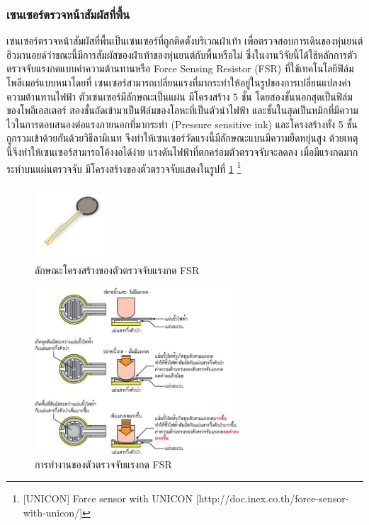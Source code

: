 \subsubsection{เซนเซอร์ตรวจหน้าสัมผัสที่พื้น}
เซนเซอร์ตรวจหน้าสัมผัสที่พื้นเป็นเซนเซอร์ที่ถูกติดตั้งบริเวณฝ่าเท้า เพื่อตรวจสอบการเดินของหุ่นยนต์ฮิวมานอยด์ว่าขณะนี้มีการสัมผัสของฝ่าเท้าของหุ่นยนต์กับพื้นหรือไม่
ซึ่งในงานวิจัยนี้ได้ใช้หลักการตัวตรวจจับแรงกดแบบค่าความต้านทานหรือ Force Sensing Resistor (FSR) ที่ใช้เทคโนโลยีฟิล์มโพลีเมอร์แบบหนาโดยที่
เซนเซอร์สามารถเปลี่ยนแรงที่มากระทำให้อยู่ในรูปของการเปลี่ยนแปลงค่าความต้านทานไฟฟ้า ตัวเซนเซอร์มีลักษณะเป็นแผ่น มีโครงสร้าง 5 ชั้น
โดยสองชั้นนอกสุดเป็นฟิล์มของโพลีเอสเตอร์ สองชั้นถัดเข้ามาเป็นฟิล์มของโลหะที่เป็นตัวนำไฟฟ้า และชั้นในสุดเป็นหมึกที่มีความไวในการตอบสนองต่อแรงภายนอกที่มากระทำ
(Pressure sensitive ink) และโครงสร้างทั้ง 5 ชั้น ถูกรวมเข้าด้วยกันด้วยวิธีลามิเนท จึงทำให้เซนเซอร์วัดแรงนี้มีลักษณะแบนมีความยืดหยุ่นสูง
ด้วยเหตุนี้จึงทำให้เซนเซอร์สามารถโค้งงอได้ง่าย แรงดันไฟฟ้าที่ตกคร่อมตัวตรวจจับจะลดลง เมื่อมีแรงกดมากระทำบนแผ่นตรวจจับ มีโครงสร้างของตัวตรวจจับแสดงในรูปที่ \ref{fig:fsr_sensor} 
\footnote{ [UNICON] Force sensor with UNICON [http://doc.inex.co.th/force-sensor-with-unicon/] }
\begin{figure}[ht]
    \centering
    \includegraphics[width=0.25\textwidth]{chapter2/images/FSRx.jpg}
    \caption{ลักษณะโครงสร้างของตัวตรวจจับแรงกด FSR}
    \label{fig:fsr_sensor}
\end{figure}

\begin{figure}[ht]
    \centering
    \includegraphics[width=0.68\textwidth]{chapter2/images/FSR.jpg}
    \caption{การทำงานของตัวตรวจจับแรงกด FSR}
    \label{fig:fsr_sensor_2}
\end{figure}

